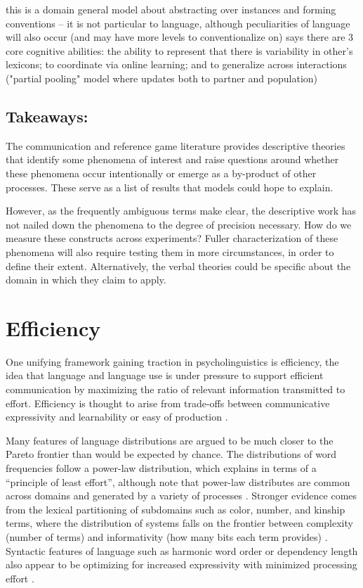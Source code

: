 \documentclass[]{article}
\begin{document}
this is a domain general model about abstracting over instances and forming conventions -- it is not particular to language, although peculiarities of language will also occur (and may have more levels to conventionalize on) 
\cite{hawkins2021} says there are 3 core cognitive abilities: the ability to represent that there is variability in other's lexicons; to coordinate via online learning; and to generalize across interactions ("partial pooling" model where updates both to partner and population) 

\subsection{Takeaways:} The communication and reference game literature provides descriptive theories that identify some phenomena of interest and raise questions around whether these phenomena occur intentionally or emerge as a by-product of other processes. These serve as a list of results that models could hope to explain. 

However, as the frequently ambiguous terms make clear, the descriptive work has not nailed down the phenomena to the degree of precision necessary. How do we measure these constructs across experiments? Fuller characterization of these phenomena will also require testing them in more circumstances, in order to define their extent. Alternatively, the verbal theories could be specific about the domain in which they claim to apply.  




\section{Efficiency}
One unifying framework gaining traction in psycholinguistics is efficiency, the idea that language and language use is under pressure to support efficient communication by maximizing the ratio of relevant information transmitted to effort. Efficiency is thought to arise from trade-offs between communicative expressivity and learnability or easy of production \cite{piantadosi2012, kirby2015}. 

Many features of language distributions are argued to be much closer to the Pareto frontier than would be expected by chance. The distributions of word frequencies follow a power-law distribution, which \cite{zipf1949} explains in terms of a ``principle of least effort'', although note that power-law distributes are common across domains and generated by a variety of processes \cite{piantadosi2014}. Stronger evidence comes from the lexical partitioning of subdomains such as color, number, and kinship terms, where the distribution of systems falls on the frontier between complexity (number of terms) and informativity (how many bits each term provides) \cite{keysar2000, gibson2019}. Syntactic features of language such as harmonic word order or dependency length also appear to be optimizing for increased expressivity with minimized processing effort \cite{gibson2019, hawkins1995}. 
	
\end{document}
